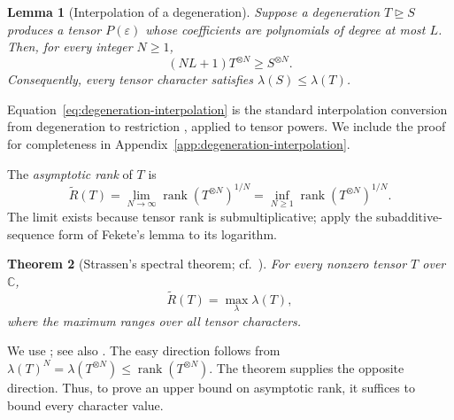 \documentclass[11pt]{article}
\newtheorem{theorem}{Theorem}[section]
\newtheorem{lemma}[theorem]{Lemma}
\newcommand{\CC}{\mathbb C}
\newcommand{\rank}{\operatorname{rank}}
\newcommand{\degen}{\unrhd}
\begin{document}
\begin{lemma}[Interpolation of a degeneration]\label{lem:degeneration-interpolation}
Suppose a degeneration $T\degen S$ produces a tensor $P(\varepsilon)$
whose coefficients are polynomials of degree at most $L$. Then, for
every integer $N\ge1$,
\begin{equation}\label{eq:degeneration-interpolation}
 (NL+1)T^{\otimes N}\ge S^{\otimes N}.
\end{equation}
Consequently, every tensor character satisfies $\lambda(S)\le\lambda(T)$.
\end{lemma}

Equation~\eqref{eq:degeneration-interpolation} is the standard interpolation
conversion from degeneration to restriction
\cite[Theorem~8]{christandl-jensen-zuiddam-2018-nonmultiplicativity}, applied
to tensor powers. We include the proof for completeness in
Appendix~\ref{app:degeneration-interpolation}.

The \emph{asymptotic rank} of $T$ is
\[
 \widetilde R(T)=\lim_{N\to\infty}\rank(T^{\otimes N})^{1/N}
 =\inf_{N\ge1}\rank(T^{\otimes N})^{1/N}.
\]
The limit exists because tensor rank is submultiplicative; apply the
subadditive-sequence form of Fekete's lemma to its logarithm.

\begin{theorem}[Strassen's spectral theorem; cf.\ {\cite[Theorem~3.8]{strassen-1988-asymptotic-spectrum}}]\label{thm:spectral}
For every nonzero tensor $T$ over $\CC$,
\begin{equation}\label{eq:spectral}
 \widetilde R(T)=\max_{\lambda}\lambda(T),
\end{equation}
where the maximum ranges over all tensor characters.
\end{theorem}

We use \cite[Theorem~3.8]{strassen-1988-asymptotic-spectrum}; see also
\cite[Corollary~3.30 of the author version]{wigderson-zuiddam-2025-asymptotic-spectra}.
The easy direction follows from
$\lambda(T)^N=\lambda(T^{\otimes N})\le\rank(T^{\otimes N})$.
The theorem supplies the opposite direction. Thus, to prove an upper
bound on asymptotic rank, it suffices to bound every character value.
\end{document}
